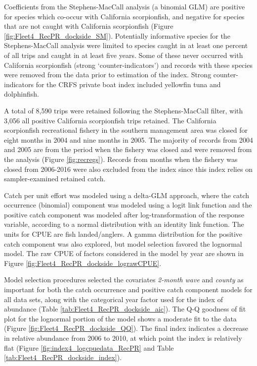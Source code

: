 \documentclass[12pt,]{article}
\begin{document}
Coefficients from the Stephens-MacCall analysis (a binomial GLM) are
positive for species which co-occur with California scorpionfish, and
negative for species that are not caught with California scorpionfish
(Figure \ref{fig:Fleet4_RecPR_dockside_SM}). Potentially informative
species for the Stephens-MacCall analysis were limited to species caught
in at least one percent of all trips and caught in at least five years.
Some of these never occurred with California scorpionfish (strong
`counter-indicators') and records with these species were removed from
the data prior to estimation of the index. Strong counter-indicators for
the CRFS private boat index included yellowfin tuna and dolphinfish.

A total of 8,590 trips were retained following the Stephens-MacCall
filter, with 3,056 all positive California scorpionfish trips retained.
The California scorpionfish recreational fishery in the southern
management area was closed for eight months in 2004 and nine months in
2005. The majority of records from 2004 and 2005 are from the period
when the fishery was closed and were removed from the analysis (Figure
\ref{fig:recregs}). Records from months when the fishery was closed from
2006-2016 were also excluded from the index since this index relies on
sampler-examined retained catch.

Catch per unit effort was modeled using a delta-GLM approach, where the
catch occurrence (binomial) component was modeled using a logit link
function and the positive catch component was modeled after
log-transformation of the response variable, according to a normal
distribution with an identity link function. The units for CPUE are fish
landed/anglers. A gamma distribution for the positive catch component
was also explored, but model selection favored the lognormal model. The
raw CPUE of factors considered in the model by year are shown in Figure
\ref{fig:Fleet4_RecPR_dockside_lograwCPUE}.

Model selection procedures selected the covariates \emph{2-month wave}
and \emph{county} as important for both the catch occurrence and
positive catch component models for all data sets, along with the
categorical year factor used for the index of abundance (Table
\ref{tab:Fleet4_RecPR_dockside_aic}). The Q-Q goodness of fit plot for
the lognormal portion of the model shows a moderate fit to the data
(Figure \ref{fig:Fleet4_RecPR_dockside_QQ}). The final index indicates a
decrease in relative abundance from 2006 to 2010, at which point the
index is relatively flat (Figure \ref{fig:index4_logcpuedata_RecPR} and
Table \ref{tab:Fleet4_RecPR_dockside_index}).
\end{document}
